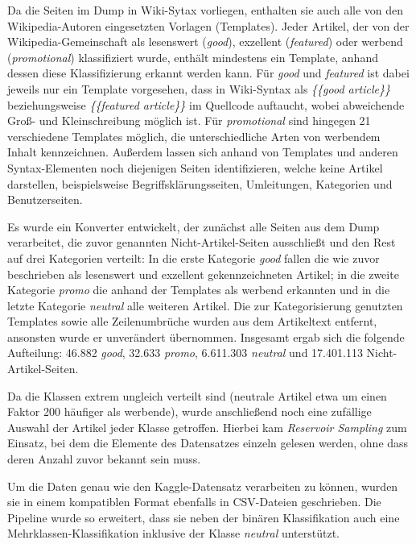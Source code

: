 Da die Seiten im Dump in Wiki-Sytax vorliegen, enthalten sie auch alle von den Wikipedia-Autoren eingesetzten Vorlagen (Templates). Jeder Artikel, der von der Wiki\-pedia-Gemeinschaft als lesenswert (\emph{good}), exzellent (\emph{featured}) oder werbend (\emph{promotional}) klassifiziert wurde, enthält mindestens ein Template, anhand dessen diese Klassifizierung erkannt werden kann. Für \emph{good} und \emph{featured} ist dabei jeweils nur ein Template vorgesehen, dass in Wiki-Syntax als \textit{\{\{good article\}\}} beziehungsweise \textit{\{\{featured article\}\}} im Quellcode auftaucht, wobei abweichende Groß- und Kleinschreibung möglich ist. Für \emph{promotional} sind hingegen 21 verschiedene Templates möglich, die unterschiedliche Arten von werbendem Inhalt kennzeichnen. Außerdem lassen sich anhand von Templates und anderen Syntax-Elementen noch diejenigen Seiten identifizieren, welche keine Artikel darstellen, beispielsweise Begriffsklärungsseiten, Umleitungen, Kategorien und Benutzerseiten.

Es wurde ein Konverter entwickelt, der zunächst alle Seiten aus dem Dump verarbeitet, die zuvor genannten Nicht-Artikel-Seiten ausschließt und den Rest auf drei Kategorien verteilt: In die erste Kategorie \emph{good} fallen die wie zuvor beschrieben als lesenswert und exzellent gekennzeichneten Artikel; in die zweite Kategorie \emph{promo} die anhand der Templates als werbend erkannten und in die letzte Kategorie \emph{neutral} alle weiteren Artikel. Die zur Kategorisierung genutzten Templates sowie alle Zeilenumbrüche wurden aus dem Artikeltext entfernt, ansonsten wurde er unverändert übernommen. Insgesamt ergab sich die folgende Aufteilung: 46.882 \emph{good}, 32.633 \emph{promo}, 6.611.303 \emph{neutral} und 17.401.113 Nicht-Artikel-Seiten.

Da die Klassen extrem ungleich verteilt sind (neutrale Artikel etwa um einen Faktor 200 häufiger als werbende), wurde anschließend noch eine zufällige Auswahl der Artikel jeder Klasse getroffen. Hierbei kam \textit{Reservoir Sampling} \cite{Vitter1985} zum Einsatz, bei dem die Elemente des Datensatzes einzeln gelesen werden, ohne dass deren Anzahl zuvor bekannt sein muss.

Um die Daten genau wie den Kaggle-Datensatz verarbeiten zu können, wurden sie in einem kompatiblen Format ebenfalls in CSV-Dateien geschrieben. Die Pipeline wurde so erweitert, dass sie neben der binären Klassifikation auch eine Mehrklassen-Klassifikation inklusive der Klasse \emph{neutral} unterstützt.

